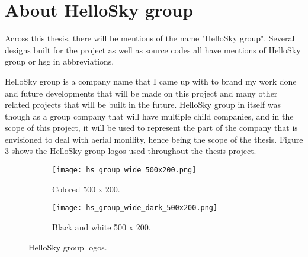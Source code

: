 \section{About HelloSky group}
\label{sec:about-hellosky-group}

Across this thesis, there will be mentions of the name "HelloSky group". Several designs built for the project as well as source codes all have mentions of HelloSky group or hsg in abbreviations.

HelloSky group is a company name that I came up with to brand my work done and future developments that will be made on this project and many other related projects that will be built in the future. HelloSky group in itself was though as a group company that will have multiple child companies, and in the scope of this project, it will be used to represent the part of the company that is envisioned to deal with aerial monility, hence being the scope of the thesis. Figure \ref{fig:hs-group-logos} shows the HelloSky group logos used throughout the thesis project.

\begin{figure}[!htbp]
    \centering
    \begin{subfigure}{0.4\textwidth}
        \texttt{[image: hs\_group\_wide\_500x200.png]}
        \caption{Colored 500 x 200.}
        \label{fig:hs-group-wide-500x200}
    \end{subfigure}
    \hspace*{\fill}
    \begin{subfigure}{0.4\textwidth}
        \texttt{[image: hs\_group\_wide\_dark\_500x200.png]}
        \caption{Black and white 500 x 200.}
        \label{fig:hs-group-wide-dark-500x200}
    \end{subfigure}
    \caption{HelloSky group logos.}
    \label{fig:hs-group-logos}
\end{figure}


